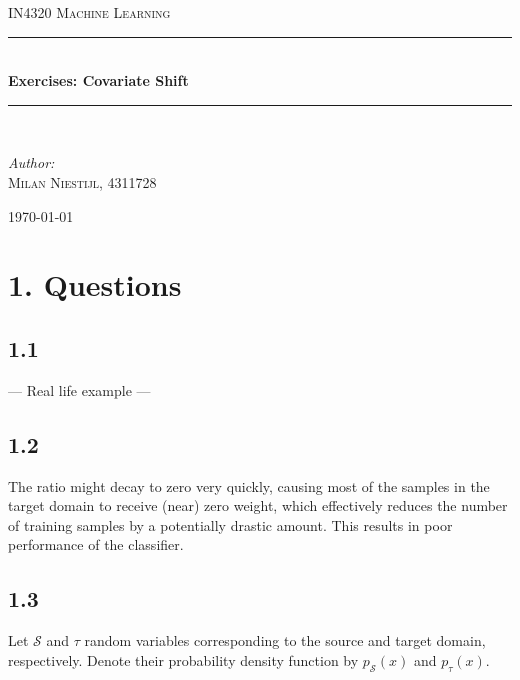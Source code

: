 \documentclass [a4paper] {report}
\begin{document}
	
	\begin{titlepage}
		\begin{center}
			
			\textsc{\LARGE IN4320 Machine Learning}\\[1.25cm]
			
			\rule{\linewidth}{0.5mm}\\[1.0cm]
			{\huge \bfseries Exercises: Covariate Shift }\\[0.6cm]
			\rule{\linewidth}{0.5mm}\\[1.5cm]
			
			\begin{minipage}{0.4\textwidth}
				\begin{flushleft} \large	
					\emph{Author:}\\
					\textsc{Milan Niestijl, 4311728}
				\end{flushleft}
			\end{minipage}
			
			\vfill
			{\large \today}
		\end{center}
	\end{titlepage}
	
	\section*{1. Questions}
	
	\subsection*{1.1}
	---	Real life example ---
	
	\subsection*{1.2}
	The ratio might decay to zero very quickly, causing most of the samples in the target domain to receive (near) zero weight, which effectively reduces the number of training samples by a potentially drastic amount. This results in poor performance of the classifier.
	
	\subsection*{1.3}
	Let $\mathcal{S}$ and $\tau$ random variables corresponding to the source and target domain, respectively. Denote their probability density function by $p_{\mathcal{S}}(x)$ and $p_{\tau}(x)$. \\
	
\end{document}
